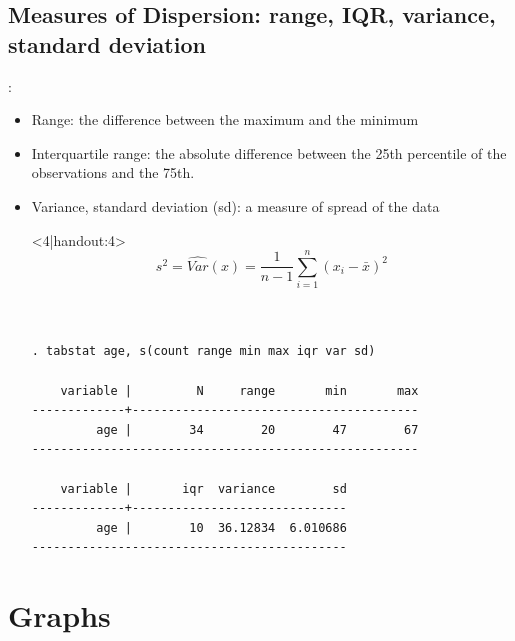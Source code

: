 \subsection{Measures of Dispersion: range, IQR, variance, standard deviation}
\begin{frame}[fragile]{{\secname: \subsecname}}	
\begin{itemize}
	\item<1|handout:1-> Range: the difference between the maximum and the minimum 
	\item<2|handout:2-> Interquartile range: the absolute difference between the 25th percentile of the observations and the 75th.
	\item<3|handout:3-> Variance, standard deviation (sd): a measure of spread of the data
	\item[]<4|handout:4>
\footnotesize
	\begin{displaymath}
s^{2} = \widehat{Var}(x)=\frac{1}{n-1} \sum_{i=1}^{n}\left(x_{i}-\bar{x}\right)^{2}
\end{displaymath}

\scriptsize
\begin{verbatim}


. tabstat age, s(count range min max iqr var sd)

    variable |         N     range       min       max
-------------+----------------------------------------
         age |        34        20        47        67
------------------------------------------------------

    variable |       iqr  variance        sd
-------------+------------------------------
         age |        10  36.12834  6.010686
--------------------------------------------
\end{verbatim}

\end{itemize}
\end{frame}

\section{Graphs}
